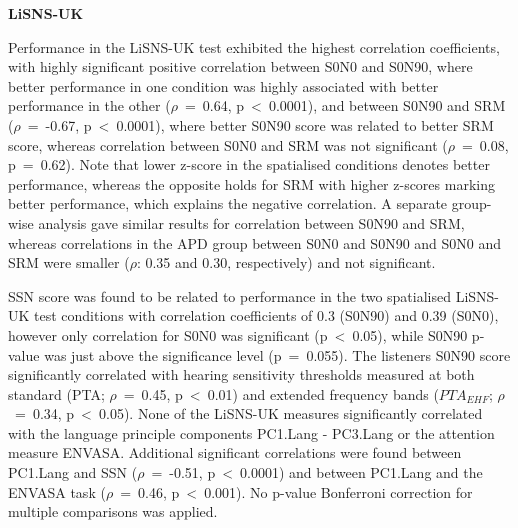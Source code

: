 \documentclass[a4paper, twoside]{templates/ociamthesis}
\begin{document}
\textbf{LiSNS-UK}

Performance in the LiSNS-UK test exhibited the highest correlation coefficients, with highly significant positive correlation between S0N0 and S0N90, where better performance in one condition was highly associated with better performance in the other (\(\rho\)~=~0.64, p~\textless~0.0001), and between S0N90 and SRM (\(\rho\)~=~-0.67, p~\textless~0.0001), where better S0N90 score was related to better SRM score, whereas correlation between S0N0 and SRM was not significant (\(\rho\)~=~0.08, p~=~0.62). Note that lower z-score in the spatialised conditions denotes better performance, whereas the opposite holds for SRM with higher z-scores marking better performance, which explains the negative correlation. A separate group-wise analysis gave similar results for correlation between S0N90 and SRM, whereas correlations in the APD group between S0N0 and S0N90 and S0N0 and SRM were smaller (\(\rho\): 0.35 and 0.30, respectively) and not significant.

SSN score was found to be related to performance in the two spatialised LiSNS-UK test conditions with correlation coefficients of 0.3 (S0N90) and 0.39 (S0N0), however only correlation for S0N0 was significant (p~\textless~0.05), while S0N90 p-value was just above the significance level (p~=~0.055). The listeners S0N90 score significantly correlated with hearing sensitivity thresholds measured at both standard (PTA; \(\rho\)~=~0.45, p~\textless~0.01) and extended frequency bands (\(PTA_{EHF}\); \(\rho\)~=~0.34, p~\textless~0.05). None of the LiSNS-UK measures significantly correlated with the language principle components PC1.Lang - PC3.Lang or the attention measure ENVASA. Additional significant correlations were found between PC1.Lang and SSN (\(\rho\)~=~-0.51, p~\textless~0.0001) and between PC1.Lang and the ENVASA task (\(\rho\)~=~0.46, p~\textless~0.001). No p-value Bonferroni correction for multiple comparisons was applied.
\end{document}
